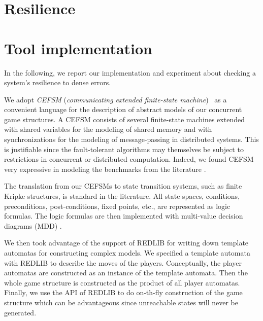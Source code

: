 \section{Resilience}

\section{Tool implementation}
In the following, we report our implementation and experiment about checking a system's resilience to dense errors. 

We adopt {\em CEFSM} ({\em communicating extended finite-state machine})~\cite{BH89} as a convenient language for the description of abstract models of our concurrent game structures. 
A CEFSM consists of several finite-state machines extended with shared variables for the modeling of shared memory and with synchronizations for the modeling of message-passing in distributed systems.
This is justifiable since the fault-tolerant algorithms may themselves be subject to  
restrictions in concurrent or distributed computation.
Indeed, we found CEFSM very expressive in modeling the 
benchmarks from the literature \cite{CL99,RSB90}.  
\smallskip

The translation from our CEFSMs to state transition systems, 
such as finite Kripke structures, is standard in the literature. 
All state spaces, conditions, preconditions, post-conditions, 
fixed points, etc., are represented as logic formulas. 
The logic formulas are then implemented with multi-value decision diagrams 
(MDD) \cite{MD98}.  

We then took advantage of the support of REDLIB for writing down 
template automatas for constructing complex models. 
We specified a template automata with REDLIB to describe the moves of the players. 
Conceptually, the player automatas are constructed as an instance of the template automata. 
Then the whole game structure is constructed as the product of all player automatas. 
Finally, we use the API of REDLIB to do on-th-fly construction of the game structure which 
can be advantageous since unreachable states will never be generated.  

